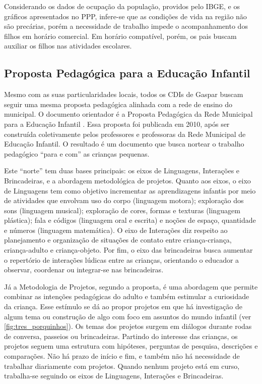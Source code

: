 Considerando os dados de ocupação da população, providos pelo IBGE, e os gráficos apresentados no \ac{PPP}, infere-se que as condições de vida na região não são precárias, porém a necessidade de trabalho impede o acompanhamento dos filhos em horário comercial. Em horário compatível, porém, os pais buscam auxiliar os filhos nas atividades escolares.

\subsection{Proposta Pedagógica para a Educação Infantil}
Mesmo com as suas particularidades locais, todos os CDIs de Gaspar buscam seguir uma mesma proposta pedagógica alinhada com a rede de ensino do municipal. O documento orientador é a Proposta Pedagógica da Rede Municipal para a Educação Infantil \cite{gaspar_proposta_2010}. Essa proposta foi publicada em 2010, após ser construída coletivamente pelos professores e professoras da Rede Municipal de Educação Infantil. O resultado é um documento que busca nortear o trabalho pedagógico “para e com” as crianças pequenas.

Este “norte” tem duas bases principais: os eixos de Linguagens, Interações e Brincadeiras, e a abordagem metodológica de projetos. Quanto aos eixos, o eixo de Linguagens tem como objetivo incrementar as aprendizagens infantis por meio de atividades que envolvam uso do corpo (linguagem motora); exploração dos sons (linguagem musical); exploração de cores, formas e texturas (linguagem plástica); fala e códigos (linguagem oral e escrita) e noções de espaço, quantidade e números (linguagem matemática). O eixo de Interações diz respeito ao planejamento e organização de situações de contato entre criança-criança, criança-adulto e criança-objeto. Por fim, o eixo das brincadeiras busca aumentar o repertório de interações lúdicas entre as crianças, orientando o educador a observar, coordenar ou integrar-se nas brincadeiras.

Já a Metodologia de Projetos, segundo a proposta, é uma abordagem que permite combinar as intenções pedagógicas do adulto e também estimular a curiosidade da criança. Esse estímulo se dá ao propor projetos em que há investigação de algum tema ou construção de algo com foco em assuntos do mundo infantil (ver \autoref{fig:tres_porquinhos}). Os temas dos projetos surgem em diálogos durante rodas de conversa, passeios ou brincadeiras. Partindo do interesse das crianças, os projetos seguem uma estrutura com hipóteses, perguntas de pesquisa, descrições e comparações. Não há prazo de início e fim, e também não há necessidade de trabalhar diariamente com projetos. Quando nenhum projeto está em curso, trabalha-se seguindo os eixos de Linguagens, Interações e Brincadeiras.

